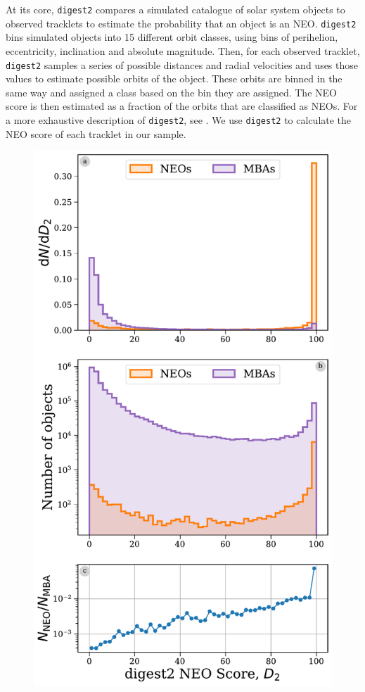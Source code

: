 \documentclass[twocolumn]{aastex631}
\newcommand{\dig}{\texttt{digest2}}
\begin{document}
At its core, \dig{} compares a simulated catalogue of solar system objects to observed tracklets to estimate the probability that an object is an NEO. \dig{} bins simulated objects into 15 different orbit classes, using bins of perihelion, eccentricity, inclination and absolute magnitude. Then, for each observed tracklet, \dig{} samples a series of possible distances and radial velocities and uses those values to estimate possible orbits of the object. These orbits are binned in the same way and assigned a class based on the bin they are assigned. The NEO score is then estimated as a fraction of the orbits that are classified as NEOs. For a more exhaustive description of \dig{}, see \citet{Keys+2019}. We use \dig{} to calculate the NEO score of each tracklet in our sample. 

\begin{figure}[b]
    \centering
    \includegraphics[width=\columnwidth]{digest2_pollution.pdf}

\end{figure}
\end{document}
